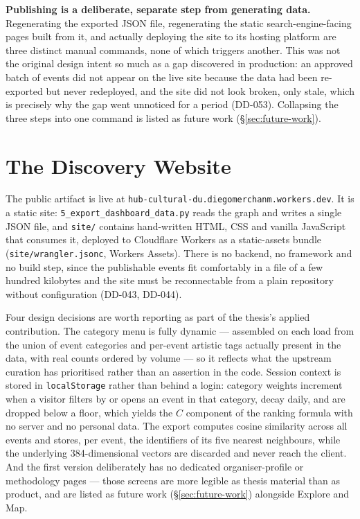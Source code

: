 \documentclass[12pt, a4paper]{report}
\begin{document}
\textbf{Publishing is a deliberate, separate step from generating data.}
Regenerating the exported JSON file, regenerating the static
search-engine-facing pages built from it, and actually deploying the
site to its hosting platform are three distinct manual commands, none of
which triggers another. This was not the original design intent so much
as a gap discovered in production: an approved batch of events did not
appear on the live site because the data had been re-exported but never
redeployed, and the site did not look broken, only stale, which is
precisely why the gap went unnoticed for a period (DD-053). Collapsing
the three steps into one command is listed as future work
(\S\ref{sec:future-work}).

\section{The Discovery Website}
\label{sec:website}

The public artifact is live at
\texttt{hub-cultural-du.diegomerchanm.workers.dev}. It is a static
site: \texttt{5\_export\_dashboard\_data.py}
reads the graph and writes a single JSON file, and \texttt{site/}
contains hand-written HTML, CSS and vanilla JavaScript that consumes it,
deployed to Cloudflare Workers as a static-assets bundle
(\texttt{site/wrangler.jsonc}, Workers Assets). There is no backend, no
framework and no build step, since the publishable events fit comfortably
in a file of a few hundred kilobytes and the site must be reconnectable
from a plain repository without configuration (DD-043, DD-044).

Four design decisions are worth reporting as part of the thesis's
applied contribution. The category menu is fully dynamic — assembled on
each load from the union of event categories and per-event artistic tags
actually present in the data, with real counts ordered by volume — so it
reflects what the upstream curation has prioritised rather than an
assertion in the code. Session context is stored in
\texttt{localStorage} rather than behind a login: category weights
increment when a visitor filters by or opens an event in that category,
decay daily, and are dropped below a floor, which yields the $C$
component of the ranking formula with no server and no personal data.
The export computes cosine similarity across all events and stores, per
event, the identifiers of its five nearest neighbours, while the
underlying 384-dimensional vectors are discarded and never reach the
client. And the first version deliberately has no dedicated
organiser-profile or methodology pages — those screens are more legible
as thesis material than as product, and are listed as future work
(\S\ref{sec:future-work}) alongside Explore and Map.
\end{document}

